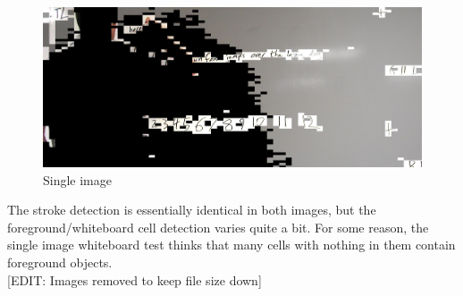 \documentclass[]{article}
\begin{document}
\begin{figure}[H]
\centering
\includegraphics[scale=0.25]{images/griffin_foreground2}
\caption{Single image}
\end{figure}	
	
	The stroke detection is essentially identical in both images, but the foreground/whiteboard cell detection varies quite a bit.  For some reason, the single image whiteboard test thinks that many cells with nothing in them contain foreground objects. \\
	
	[EDIT: Images removed to keep file size down] \\
\end{document}
